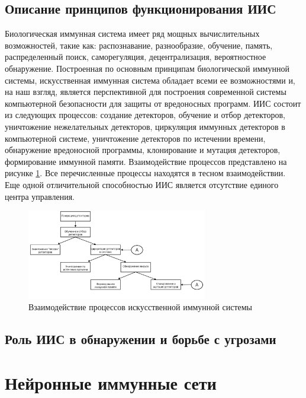 \documentclass[bachelor, och, referat]{template}
\begin{document}
\subsection{Описание принципов функционирования ИИС}

Биологическая иммунная система имеет ряд мощных вычислительных возможностей, 
такие как: распознавание, разнообразие, обучение, память, распределенный поиск,
саморегуляция, децентрализация, вероятностное обнаружение.
Построенная по основным принципам биологической иммунной системы, 
искусственная иммунная система обладает всеми ее возможностями
и, на наш взгляд, является перспективной для построения современной
системы компьютерной безопасности для защиты от вредоносных про­грамм. 
ИИС состоит из следующих процессов: создание детекторов, обу­чение и отбор 
детекторов, уничтожение нежелательных детекторов, цир­куляция 
иммунных детекторов в компьютерной системе, уничтожение
детекторов по истечении времени, обнаружение вредоносной программы,
клонирование и мутация детекторов, формирование иммунной памяти. 
Взаимодействие процессов представлено на рисунке \ref{s1}. Все 
перечислен­ные процессы находятся в тесном взаимодействии. Еще одной 
отличи­тельной способностью ИИС является отсутствие единого центра 
управле­ния.

\begin{figure}[H]
    \centering
    \includegraphics[width=0.7\textwidth]{pics/1.png}
    \caption{Взаимодействие процессов искусственной иммунной системы}
    \label{s1}
\end{figure} 

\subsection{Роль ИИС в обнаружении и борьбе с угрозами}

\section{Нейронные иммунные сети}
\end{document}
